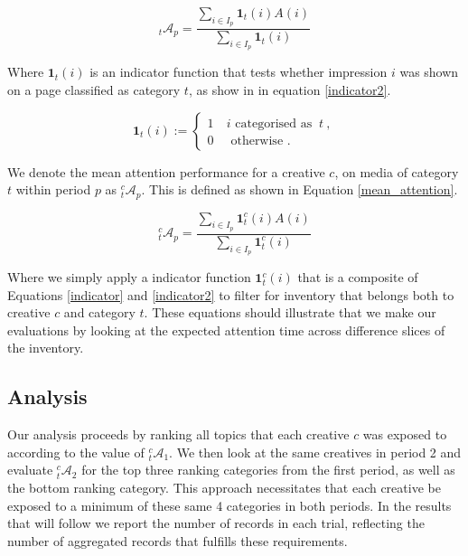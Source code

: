 \documentclass[sigconf]{acmart}
\begin{document}
\begin{equation}
\label{topic_baseline}
{}_t\mathcal{A}_p =  \frac{ \sum_{i \in I_p} \mathbf{1}_t(i) A(i) }{ \sum_{i \in I_p} \mathbf{1}_t(i) }
\end{equation}

Where $\mathbf{1}_t(i)$ is an indicator function that
tests whether impression $i$ was shown on a page classified as category $t$,
as show in in equation \ref{indicator2}.

\begin{equation}
\label{indicator2}
  \mathbf{1}_{t}(i):=
  \begin{cases}1~&{ i\text{ categorised as }}~t~,\\0~&{\text{ otherwise }}.\end{cases}
\end{equation}

We denote the mean attention performance for a creative $c$, on media of category $t$
within period $p$ as ${}^c_t\mathcal{A}_p$.
This is defined as shown in Equation \ref{mean_attention}.

\begin{equation}
\label{mean_attention}
{}^c_t\mathcal{A}_p =  \frac{ \sum_{i \in I_p} \mathbf{1}^c_t(i) A(i) }{ \sum_{i \in I_p} \mathbf{1}^c_t(i) }
\end{equation}

Where we simply apply a indicator function $\mathbf{1}^c_t(i)$ that is a composite
of Equations \ref{indicator} and \ref{indicator2} to filter for inventory that
belongs both to creative $c$ and category $t$. These equations should illustrate that we
make our evaluations by looking at the expected attention time across difference slices
of the inventory.

\subsection{Analysis}

Our analysis proceeds by ranking all topics that each creative $c$ was exposed
to according to the value of ${}^c_t\mathcal{A}_1$.
We then look at the same creatives in period 2 and
evaluate ${}^c_t\mathcal{A}_2$ for the top three ranking categories from the first period,
as well as the bottom ranking category.
This approach necessitates that each creative be exposed to a minimum
of these same 4 categories in both periods.
In the results that will follow we report the number
of records in each trial, reflecting the number of aggregated records
that fulfills these requirements.
\end{document}
